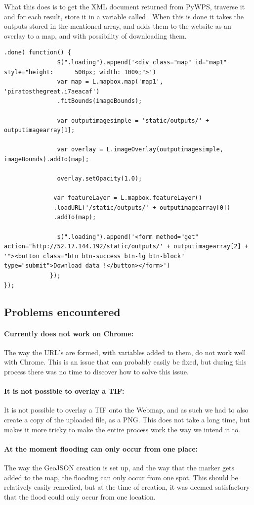 What this does is to get the XML document returned from PyWPS, traverse it and for each result, store it in a variable called .
When this is done it takes the outputs stored in the mentioned array, and adds them to the website as an overlay to a map, and with possibility of downloading them.

\begin{lstlisting}
.done( function() {
               $(".loading").append('<div class="map" id="map1" style="height: 		500px; width: 100%;">')
               var map = L.mapbox.map('map1', 'piratosthegreat.i7aeacaf')
               .fitBounds(imageBounds);

               var outputimagesimple = 'static/outputs/' + outputimagearray[1];

               var overlay = L.imageOverlay(outputimagesimple, 				imageBounds).addTo(map);

               overlay.setOpacity(1.0);

              var featureLayer = L.mapbox.featureLayer()
              .loadURL('/static/outputs/' + outputimagearray[0])
              .addTo(map);

               $(".loading").append('<form method="get" action="http://52.17.144.192/static/outputs/' + outputimagearray[2] + '"><button class="btn btn-success btn-lg btn-block" type="submit">Download data !</button></form>')
             });
});
\end{lstlisting}

\subsection{Problems encountered}
\paragraph{Currently does not work on Chrome:} The way the URL's are formed, with variables added to them, do not work well with Chrome. This is an issue that can probably easily be fixed, but during this process there was no time to discover how to solve this issue. 

\paragraph{It is not possible to overlay a TIF:} It is not possible to overlay a TIF onto the Webmap, and as such we had to also create a copy of the uploaded file, as a PNG. This does not take a long time, but makes it more tricky to make the entire process work the way we intend it to.  

\paragraph{At the moment flooding can only occur from one place:} The way the GeoJSON creation is set up, and the way that the marker gets added to the map, the flooding can only occur from one spot. This should be relatively easily remedied, but at the time of creation, it was deemed satisfactory that the flood could only occur from one location.